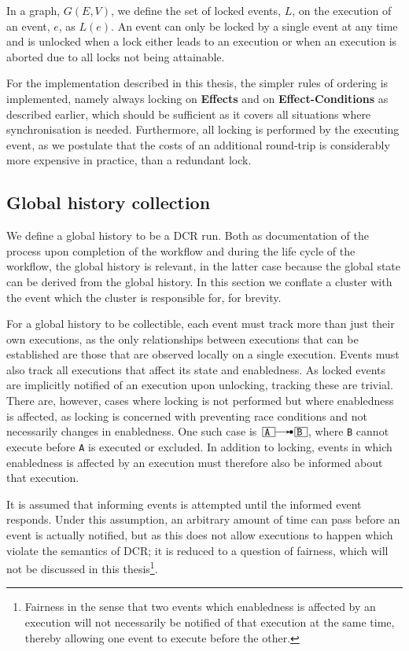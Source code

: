 \documentclass{article}
\begin{document}
	In a graph, $G(E,V)$, we define the set of locked events, $L$, on the execution of an event, $e$, as $L(e)$.
	An event can only be locked by a single event at any time and is unlocked when a lock either leads to an execution or when an execution is aborted due to all locks not being attainable.

	For the implementation described in this thesis, the simpler rules of ordering is implemented, namely always locking on \textbf{Effects} and on \textbf{Effect-Conditions} as described earlier, which should be sufficient as it covers all situations where synchronisation is needed.
	Furthermore, all locking is performed by the executing event, as we postulate that the costs of an additional round-trip is considerably more expensive in practice, than a redundant lock.

	\subsection{Global history collection}
	\label{subsec:global-history-collection}

	We define a global history to be a DCR run.
	Both as documentation of the process upon completion of the workflow and during the life cycle of the workflow, the global history is relevant, in the latter case because the global state can be derived from the global history.
	In this section we conflate a cluster with the event which the cluster is responsible for, for brevity.

	For a global history to be collectible, each event must track more than just their own executions, as the only relationships between executions that can be established are those that are observed locally on a single execution.
	Events must also track all executions that affect its state and enabledness.
	As locked events are implicitly notified of an execution upon unlocking, tracking these are trivial.
	There are, however, cases where locking is not performed but where enabledness is affected, as locking is concerned with preventing race conditions and not necessarily changes in enabledness.
	One such case is $\ev{A} \crel \ev{B}$, where \texttt{B} cannot execute before \texttt{A} is executed or excluded.
	In addition to locking, events in which enabledness is affected by an execution must therefore also be informed about that execution.

	It is assumed that informing events is attempted until the informed event responds.
	Under this assumption, an arbitrary amount of time can pass before an event is actually notified, but as this does not allow executions to happen which violate the semantics of DCR; it is reduced to a question of fairness, which will not be discussed in this thesis\footnote{Fairness in the sense that two events which enabledness is affected by an execution will not necessarily be notified of that execution at the same time, thereby allowing one event to execute before the other.}.
\end{document}

